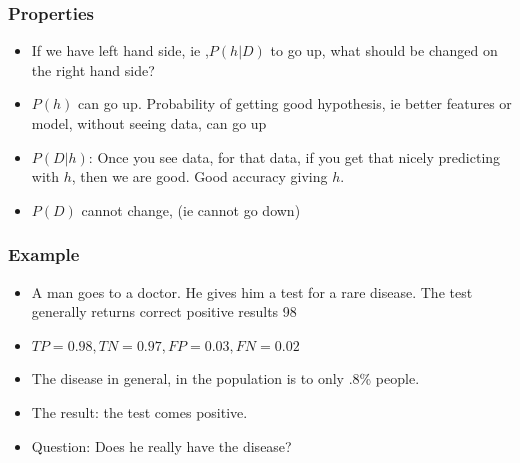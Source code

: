 \begin{frame}[fragile]\frametitle{Properties}

\begin{itemize}
\item If we have left hand side, ie ,$P(h|D)$ to go up, what should be changed on the right hand side?
\item $P(h)$ can go up. Probability of getting good hypothesis, ie better features or model, without seeing data, can go up
\item $P(D|h)$: Once you see data, for that data,  if you get that nicely predicting with $h$, then we are good. Good accuracy giving $h$.
\item $P(D)$ cannot change, (ie cannot go down)

\end{itemize}

\end{frame}

\begin{frame}[fragile]\frametitle{Example}

\begin{itemize}
\item A man goes to a doctor. He gives him a test for a rare disease. The test generally returns correct positive results 98%
\item $TP=0.98, TN=0.97, FP=0.03, FN=0.02$
\item The disease in general, in the population is to only .8\% people.
\item The result: the test comes positive.
\item Question: Does he really have the disease?


\end{itemize}

\end{frame}



